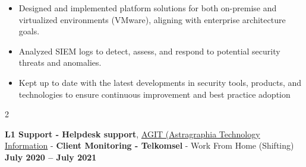 \documentclass[10pt, letterpaper]{article}
\newenvironment{highlights}{
    \begin{itemize}[
        topsep=0.10 cm,
        parsep=0.10 cm,
        partopsep=0pt,
        itemsep=0pt,
        leftmargin=0 cm + 10pt
    ]
}{
    \end{itemize}
} %
\newenvironment{twocolentry}[2][]{
    \onecolentry
    \def\secondColumn{#2}
    \setcolumnwidth{\fill, 4.5 cm}
    \begin{paracol}{2}
}{
    \switchcolumn \raggedleft \secondColumn
    \end{paracol}
    \endonecolentry
} %
\let\hrefWithoutArrow\href
\begin{document}
\begin{justify}
\begin{highlights}
            \item Designed and implemented platform solutions for both on-premise and virtualized environments (VMware), aligning with enterprise architecture goals.

            \item Analyzed SIEM logs to detect, assess, and respond to potential security threats and anomalies.

             \item Kept up to date with the latest developments in security tools, products, and technologies to ensure continuous improvement and best practice adoption
			\end{highlights}
		\end{justify}

			\begin{twocolentry}{\textbf{July 2020 – July 2021}}
			\textbf{L1 Support - Helpdesk support}, \hrefWithoutArrow{https://ag-it.com/}{AGIT (Astragraphia Technology Information} - \textbf{Client Monitoring - Telkomsel} - Work From Home (Shifting)\end{twocolentry}
		
\end{document}
